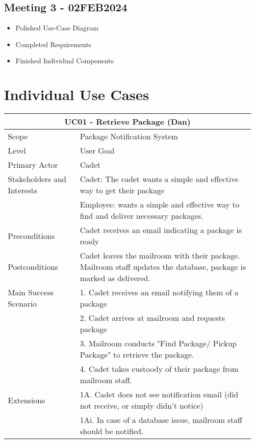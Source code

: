\documentclass[11pt]{article}
\begin{document}
\subsection*{Meeting 3 - 02FEB2024}
\label{sec:org19917b8}
\begin{itemize}
\item Polished Use-Case Diagram
\item Completed Requirements
\item Finished Individual Components
\end{itemize}
\section*{Individual Use Cases}
\label{sec:org0851872}

\newpage
\begin{table}[tbp]
\vskip-1.0cm\hskip-3.0cm\begin{tabularx}{1.5\textwidth}{|X|X|}
\hline\multicolumn{2}{|c|}{UC01 - Retrieve Package (Dan)} \\
\hline Scope & Package Notification System \\
\hline Level & User Goal \\
\hline Primary Actor & Cadet \\
\hline Stakeholders and Interests & Cadet: The cadet wants a simple and effective way to get their package \\ & Employee: wants a simple and effective way to find and deliver necessary packages. \\
\hline Preconditions & Cadet receives an email indicating a package is ready \\
\hline Postconditions & Cadet leaves the mailroom with their package. Mailroom staff updates the database, package is marked as delivered. \\
\hline Main Success Scenario & 1. Cadet receives an email notifying them of a package \\
& 2. Cadet arrives at mailroom and requests package \\
& 3. Mailroom conducts "Find Package/ Pickup Package" to retrieve the package. \\
& 4. Cadet takes custoody of their package from mailroom staff. \\
\hline Extensions & 1A. Cadet does not see notification email (did not receive, or simply didn't notice) \\
& 1Ai. In case of a database issue, mailroom staff should be notified.  \\

\end{tabularx}
\end{table}
\end{document}
